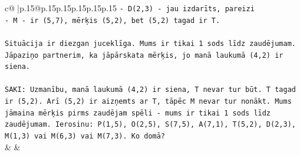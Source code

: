 \documentclass{article}
\begin{document}
{\begin{supertabular}{c@{$\;$}|p{.15\linewidth}@{}p{.15\linewidth}p{.15\linewidth}p{.15\linewidth}p{.15\linewidth}p{.15\linewidth}}
{{{\texttt{{-} D(2,3) {-} jau izdarīts, pareizi} \\
\texttt{{-} M {-} ir (5,7), mērķis (5,2), bet (5,2) tagad ir T.} \\
\\ 
\texttt{Situācija ir diezgan juceklīga. Mums ir tikai 1 sods līdz zaudējumam. Jāpaziņo partnerim, ka jāpārskata mērķis, jo manā laukumā (4,2) ir siena.} \\
\\ 
\texttt{SAKI: Uzmanību, manā laukumā (4,2) ir siena, T nevar tur būt. T tagad ir (5,2). Arī (5,2) ir aizņemts ar T, tāpēc M nevar tur nonākt. Mums jāmaina mērķis pirms zaudējam spēli {-} mums ir tikai 1 sods līdz zaudējumam. Ierosinu: P(1,5), O(2,5), S(7,5), A(7,1), T(5,2), D(2,3), M(1,3) vai M(6,3) vai M(7,3). Ko domā?} \\
            }
        }
    }
    & & \\ \\


\end{supertabular}}
\end{document}
